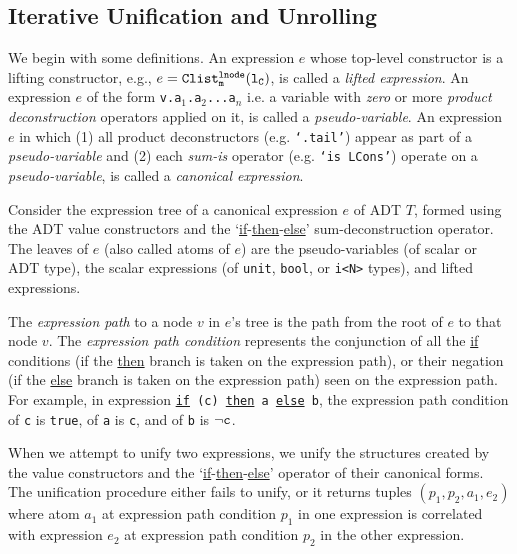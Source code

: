 \subsection{Iterative Unification and Unrolling}
\label{sec:unifyAndUnroll}

We begin with some definitions.
An expression $e$ whose top-level constructor
is a lifting constructor, e.g., $e={\tt Clist^{{\tt lnode}}_m({\tt l}_C)}$,
is called a {\em lifted expression}.
An expression $e$ of the form {\tt v.a$_1$.a$_2$...a$_n$} i.e. a variable
with {\em zero} or more {\em product deconstruction} operators applied on it, is called a {\em pseudo-variable}.
An expression $e$ in which (1) all product deconstructors (e.g. {\tt `.tail'}) appear as part
of a {\em pseudo-variable} and (2) each {\em sum-is} operator (e.g. {\tt `is LCons'})
operate on a {\em pseudo-variable}, is called a {\em canonical expression}.

Consider the expression tree of a canonical expression $e$ of ADT $T$,
formed using the ADT value constructors and the `\underline{if}-\underline{then}-\underline{else}'
sum-deconstruction operator.
The leaves of $e$ (also called atoms of $e$) are
the pseudo-variables (of scalar or ADT type),
the scalar expressions (of {\tt unit}, {\tt bool}, or {\tt i<N>} types),
and lifted expressions.

The
{\em expression path} to a node $v$ in $e$'s tree
is the path from the root of $e$
to that node $v$. The {\em expression path condition} represents
the conjunction of all the \underline{if} conditions (if
the \underline{then} branch is taken on the expression path), or their
negation (if the \underline{else} branch is taken on the
expression path) seen on the expression path.  For example,
in expression {\tt \underline{if} (c) \underline{then} a \underline{else} b},
the expression path condition of {\tt c} is {\tt true}, of {\tt a} is {\tt c},
and of {\tt b} is $\neg{\tt c}$.

When we attempt to unify two expressions, we unify the
structures created by the value constructors and the `\underline{if}-\underline{then}-\underline{else}'
operator of their canonical forms.
The unification procedure either fails to unify, or it
returns tuples $(p_1,p_2,a_1,e_2)$ where atom $a_1$
at expression path condition $p_1$ in one expression is correlated with
expression $e_2$ at expression path condition $p_2$ in the other expression.


